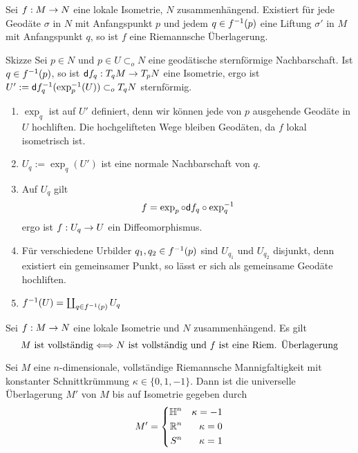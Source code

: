 \documentclass{book}
\renewcommand{\d}{\textsf{d}}
\begin{document}
\Satz{}
Sei $f : M\overset{}{\rightarrow} N$ eine lokale Isometrie, $N$ zusammenhängend. Existiert für jede Geodäte $\sigma$ in $N$ mit Anfangspunkt $p$ und jedem $q \in f^{-1}(p)$ eine Liftung $\sigma'$ in $M$ mit Anfangspunkt $q$, so ist $f$ eine Riemannsche Überlagerung.
\begin{Beweis}{Skizze}
Sei $p \in N$ und $p\in U \subset_o N$ eine geodätische sternförmige Nachbarschaft. Ist $q \in f^{-1}(p)$, so ist $\d f_q : T_qM \pfeil{} T_pN$ eine Isometrie, ergo ist $U':=\d f_q\i(\exp_p\i(U)) \subset_o T_qN$ sternförmig.
\begin{enumerate}[(1)]
\item $\exp_q$ ist auf $U'$ definiert, denn wir können jede von $p$ ausgehende Geodäte in $U$ hochliften. Die hochgelifteten Wege bleiben Geodäten, da $f$ lokal isometrisch ist.
\item $U_q := \exp_q(U')$ ist eine normale Nachbarschaft von $q$.
\item Auf $U_q$ gilt
\[ f = \exp_p \circ \d f_q \circ \exp_q\i \]
ergo ist $f : U_q \overset{}{\rightarrow} U$ ein Diffeomorphismus.
\item Für verschiedene Urbilder $q_1,q_2 \in f^{-1}(p)$ sind $U_{q_1}$ und $U_{q_2}$ disjunkt, denn existiert ein gemeinsamer Punkt, so lässt er sich als gemeinsame Geodäte hochliften.
\item $f^{-1}(U) = \coprod_{q\in f^{-1}(p)} U_q$
\end{enumerate}
\end{Beweis}

\Kor{}
Sei $f : M\overset{}{\rightarrow} N$ eine lokale Isometrie und $N$ zusammenhängend. Es gilt
\[ M \text{ ist vollständig} \overset{}{\Longleftrightarrow} N \text{ ist vollständig und } f \text{ ist eine Riem. Überlagerung} \]

\Satz{}
Sei $M$ eine $n$-dimensionale, vollständige Riemannsche Mannigfaltigkeit mit konstanter Schnittkrümmung $\kappa \in\{0,1,-1\}$. Dann ist die universelle Überlagerung $M'$ von $M$ bis auf Isometrie gegeben durch
\[ M' =
\left\lbrace
\begin{aligned}
\mathbb{H}^n && \kappa = -1\\
\mathbb{R}^n && \kappa = 0\\
S^n && \kappa = 1
\end{aligned}
\right.
\]
\end{document}
